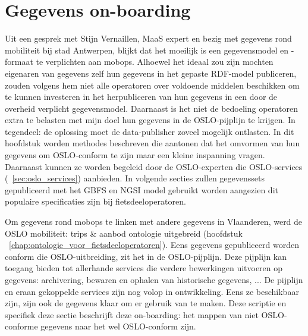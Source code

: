 \chapter{Gegevens on-boarding}
\label{chap:on-boarding}

Uit een gesprek met Stijn Vernaillen, MaaS expert en bezig met gegevens rond mobiliteit bij stad Antwerpen, blijkt dat het moeilijk is een gegevensmodel en -formaat te verplichten aan \glspl{mobop}. 
Alhoewel het ideaal zou zijn mochten eigenaren van gegevens zelf hun gegevens in het gepaste RDF-model publiceren, zouden volgens hem niet alle operatoren over voldoende middelen beschikken om te kunnen investeren in het herpubliceren van hun gegevens in een door de overheid verplicht gegevensmodel\cite{vernaillen}.
Daarnaast is het niet de bedoeling operatoren extra te belasten met mijn doel hun gegevens in de OSLO-pijplijn te krijgen. In tegendeel: de oplossing moet de data-publisher zoveel mogelijk ontlasten.
In dit hoofdstuk worden methodes beschreven die aantonen dat het omvormen van hun gegevens om OSLO-conform te zijn maar een kleine inspanning vragen. Daarnaast kunnen ze worden begeleid door de OSLO-experten die OSLO-services (~\ref{sec:oslo_services}) aanbieden.
In volgende secties zullen gegevenssets gepubliceerd met het GBFS en NGSI model gebruikt worden aangezien dit populaire specificaties zijn bij fietsdeeloperatoren.

Om gegevens rond \glspl{mobop} te linken met andere gegevens in Vlaanderen, werd de OSLO mobiliteit: trips \& aanbod ontologie uitgebreid (hoofdstuk ~\ref{chap:ontologie_voor_fietsdeeloperatoren}). Eens gegevens gepubliceerd worden conform die OSLO-uitbreiding, zit het in de OSLO-pijplijn. Deze pijplijn kan toegang bieden tot allerhande services die verdere bewerkingen uitvoeren op gegevens: archivering, bewaren en ophalen van historische gegevens, ... De pijplijn en eraan gekoppelde services zijn nog volop in ontwikkeling. Eens ze beschikbaar zijn, zijn ook de gegevens klaar om er gebruik van te maken. Deze scriptie en specifiek deze sectie beschrijft deze on-boarding: het mappen van niet OSLO-conforme gegevens naar het wel OSLO-conform zijn.

